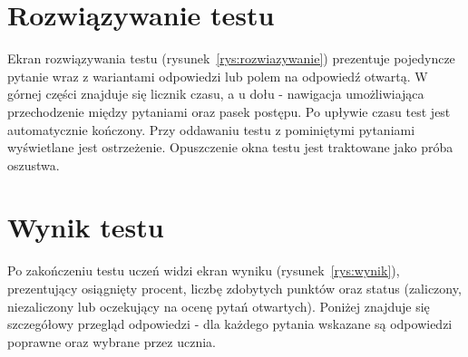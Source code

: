\section{Rozwiązywanie testu}
\label{sec:rozwiazywanie}

Ekran rozwiązywania testu (rysunek~\ref{rys:rozwiazywanie}) prezentuje pojedyncze pytanie wraz
z wariantami odpowiedzi lub polem na odpowiedź otwartą. W górnej części znajduje się licznik czasu,
a u dołu - nawigacja umożliwiająca przechodzenie między pytaniami oraz pasek postępu. Po upływie
czasu test jest automatycznie kończony. Przy oddawaniu testu z pominiętymi pytaniami wyświetlane
jest ostrzeżenie. Opuszczenie okna testu jest traktowane jako próba oszustwa.


\section{Wynik testu}
\label{sec:wynik}

Po zakończeniu testu uczeń widzi ekran wyniku (rysunek~\ref{rys:wynik}), prezentujący osiągnięty
procent, liczbę zdobytych punktów oraz status (zaliczony, niezaliczony lub oczekujący na ocenę
pytań otwartych). Poniżej znajduje się szczegółowy przegląd odpowiedzi - dla każdego pytania
wskazane są odpowiedzi poprawne oraz wybrane przez ucznia.

